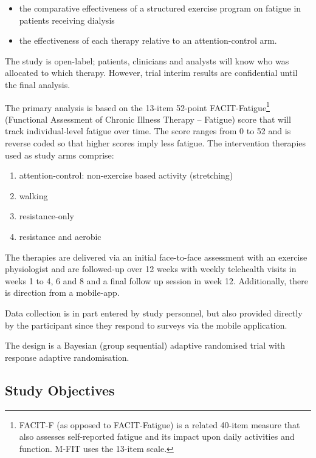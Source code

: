 \documentclass[11pt,parskip=half-]{scrartcl}
\providecommand{\tightlist}{%
  \setlength{\itemsep}{0pt}\setlength{\parskip}{0pt}}
\begin{document}
\begin{itemize}\tightlist
  \item the comparative effectiveness of a structured exercise program on fatigue in patients receiving dialysis
  \item the effectiveness of each therapy relative to an attention-control arm.
\end{itemize}

The study is open-label; patients, clinicians and analysts will know who was allocated to which therapy. However, trial interim results are confidential until the final analysis.

The primary analysis is based on the 13-item 52-point FACIT-Fatigue\footnote{FACIT-F (as opposed to FACIT-Fatigue) is a related 40-item measure that also assesses self-reported fatigue and its impact upon daily activities and function. M-FIT uses the 13-item scale.} (Functional Assessment of Chronic Illness Therapy – Fatigue) score that will track individual-level fatigue over time. The score ranges from 0 to 52 and is reverse coded so that higher scores imply less fatigue. The intervention therapies used as study arms comprise:

\begin{enumerate}\tightlist
  \item attention-control: non-exercise based activity (stretching)
  \item walking
  \item resistance-only
  \item resistance and aerobic
\end{enumerate}

The therapies are delivered via an initial face-to-face assessment with an exercise physiologist and are followed-up over 12 weeks with weekly telehealth visits in weeks 1 to 4, 6 and 8 and a final follow up session in week 12. Additionally, there is direction from a mobile-app.

Data collection is in part entered by study personnel, but also provided directly by the participant since they respond to surveys via the mobile application.

The design is a Bayesian (group sequential) adaptive randomised trial with response adaptive randomisation.

\clearpage

\subsection{Study Objectives}
\label{objectives}
\end{document}
